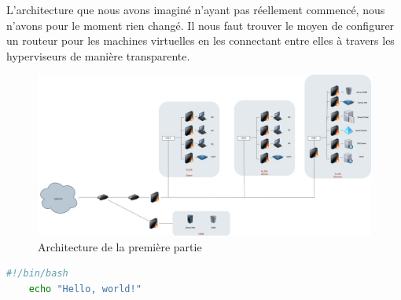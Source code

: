 \documentclass[../file.tex]{subfiles}
\begin{document}
	
L'architecture que nous avons imaginé n'ayant pas réellement commencé, nous n'avons pour le moment 
rien changé. Il nous faut trouver le moyen de configurer un routeur pour les machines virtuelles en les connectant 
entre elles à travers les hyperviseurs de manière transparente.

\begin{figure}[h]
    \centering
    \includegraphics[width=1\textwidth]{../Images/Architecture.jpg}
    \caption{Architecture de la première partie}
    \label{fig:solution1}
\end{figure}

\begin{lstlisting}[language=bash]
    #!/bin/bash
    echo "Hello, world!"
\end{lstlisting}
\end{document}
